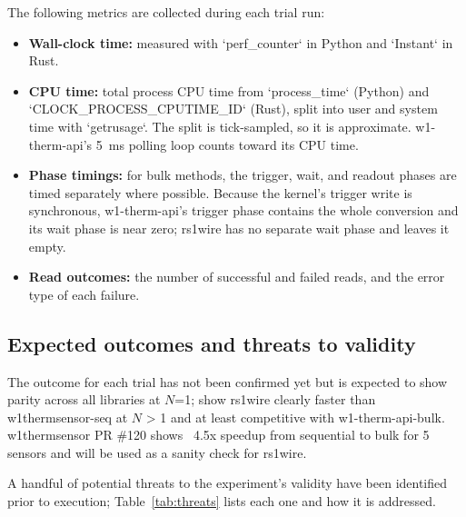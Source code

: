 \documentclass[conference]{IEEEtran}
\begin{document}
The following metrics are collected during each trial run:
\begin{itemize}
\item \textbf{Wall-clock time:} measured with `perf\_counter` in Python and `Instant` in Rust.
\item \textbf{CPU time:} total process CPU time from `process\_time` (Python) and `CLOCK\_PROCESS\_CPUTIME\_ID` (Rust), split into user and system time with `getrusage`. The split is tick-sampled, so it is approximate. w1-therm-api's 5~ms polling loop counts toward its CPU time.
\item \textbf{Phase timings:} for bulk methods, the trigger, wait, and readout phases are timed separately where possible. Because the kernel's trigger write is synchronous, w1-therm-api's trigger phase contains the whole conversion and its wait phase is near zero; rs1wire has no separate wait phase and leaves it empty.
\item \textbf{Read outcomes:} the number of successful and failed reads, and the error type of each failure.
\end{itemize}

\subsection{Expected outcomes and threats to validity}

The outcome for each trial has not been confirmed yet but is expected to show parity across all libraries at $N$=1; show rs1wire clearly faster than w1thermsensor-seq at $N$ \textgreater{} 1 and at least competitive with w1-therm-api-bulk. 
w1thermsensor PR \#120 shows ~4.5x speedup from sequential to bulk for 5 sensors \cite{w1thermsensor_pr120} and will be used as a sanity check for rs1wire.

A handful of potential threats to the experiment's validity have been identified prior to execution; Table~\ref{tab:threats} lists each one and how it is addressed.
\end{document}

